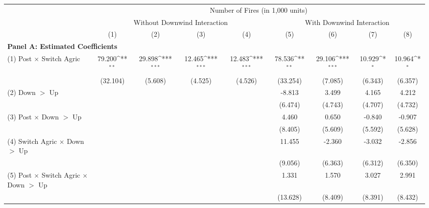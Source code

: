 {
\def\sym#1{\ifmmode^{#1}\else\(^{#1}\)\fi}
\begin{tabular}{l*{8}{c}}
\hline
            & \multicolumn{8}{c}{Number of Fires (in 1,000 units)} \\
            & \multicolumn{4}{c}{Without Downwind Interaction} & \multicolumn{4}{c}{With Downwind Interaction} \\
            & (1) & (2) & (3) & (4) & (5) & (6) & (7) & (8) \\ \hline
\multicolumn{9}{l}{\textbf{Panel A: Estimated Coefficients}} \\ \hline
(1) Post $\times$ Switch Agric&      79.200\sym{**} &      29.898\sym{***}&      12.465\sym{***}&      12.483\sym{***}&      78.536\sym{**} &      29.106\sym{***}&      10.929\sym{*}  &      10.964\sym{*}  \\
            &    (32.104)         &     (5.608)         &     (4.525)         &     (4.526)         &    (33.254)         &     (7.085)         &     (6.343)         &     (6.357)         \\
(2) Down $>$ Up&                     &                     &                     &                     &      -8.813         &       3.499         &       4.165         &       4.212         \\
            &                     &                     &                     &                     &     (6.474)         &     (4.743)         &     (4.707)         &     (4.732)         \\
(3) Post $\times$ Down $>$ Up&                     &                     &                     &                     &       4.460         &       0.650         &      -0.840         &      -0.907         \\
            &                     &                     &                     &                     &     (8.405)         &     (5.609)         &     (5.592)         &     (5.628)         \\
(4) Switch Agric  $\times$ Down $>$ Up&                     &                     &                     &                     &      11.455         &      -2.360         &      -3.032         &      -2.856         \\
            &                     &                     &                     &                     &     (9.056)         &     (6.363)         &     (6.312)         &     (6.350)         \\
(5) Post $\times$ Switch Agric  $\times$ Down $>$ Up&                     &                     &                     &                     &       1.331         &       1.570         &       3.027         &       2.991         \\
            &                     &                     &                     &                     &    (13.628)         &     (8.409)         &     (8.391)         &     (8.432)         \\





\end{tabular}}
